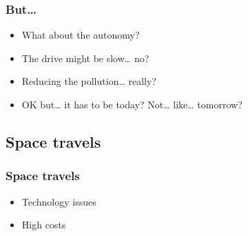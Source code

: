 \begin{frame}
\frametitle{But…}
\begin{itemize}
    \itemsep1.5em
    \item What about the autonomy?
    \item The drive might be slow… no?
    \item Reducing the pollution… really?
    \item OK but… it has to be today? Not… like… tomorrow?
\end{itemize}
\end{frame}


\subsection{Space travels}

\begin{frame}
\frametitle{Space travels}
\begin{itemize}
    \itemsep1.5em
    \item Technology issues
    \item High costs
\end{itemize}
\end{frame}
